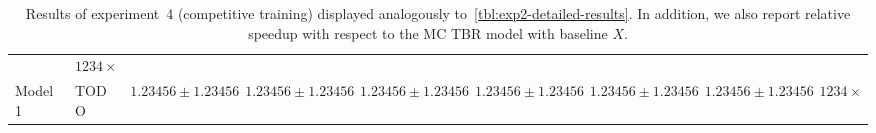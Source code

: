 \begin{table}[h]
{\begin{tabular}{llrrrrrrr}
						& $\num{1234}\times$
		\\
		Model 1
						& TODO
						& $\num{1.23456} \pm \num{1.23456}$
						& $\num{1.23456} \pm \num{1.23456}$
						& $\num{1.23456} \pm \num{1.23456}$
						& $\num{1.23456} \pm \num{1.23456}$
						& $\num{1.23456} \pm \num{1.23456}$
						& $\num{1.23456} \pm \num{1.23456}$
						& $\num{1234}\times$
		\\
		\bottomrule
		\end{tabular}
	}
	\caption{Results of experiment~4 (competitive training) displayed analogously
		to~\cref{tbl:exp2-detailed-results}. In addition, we also report
		relative speedup with respect to the MC TBR model with baseline $X$.} %
	\label{tbl:exp4-detailed-results}
\end{table}

